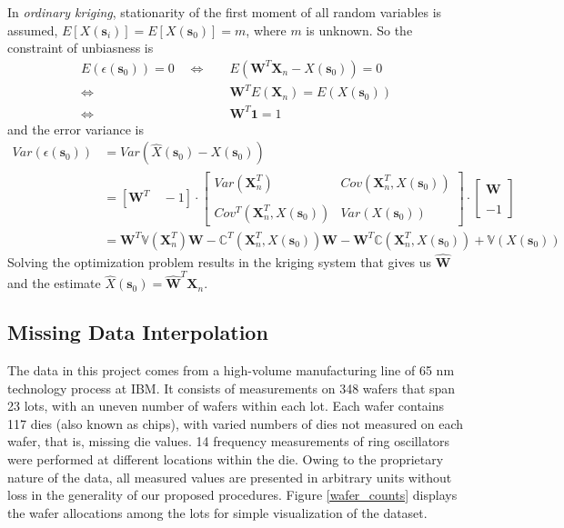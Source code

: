 \documentclass[english]{article}
\numberwithin{equation}{section}
\numberwithin{table}{section}
\numberwithin{figure}{section}
\newcommand{\bms}{\bm{s}}
\begin{document}
In \emph{ordinary kriging}, stationarity of the first moment of
all random variables is assumed, $ E[X(\bms_i)] = E[X(\bms_0)] = m$,
where $m$ is unknown. So the constraint of unbiasness is 
\begin{equation} \label{unbias}
\begin{split}
  E(\epsilon(\bms_0)) = 0 \quad 
  \Leftrightarrow \quad &E(\bm{W}^T\bm{X}_n - X(\bms_0)) = 0 \\
  \Leftrightarrow \quad &\bm{W}^TE(\bm{X}_n) = E(X(\bms_0)) \\
  \Leftrightarrow \quad &\bm{W}^T\bm{1} = 1
\end{split}
\end{equation}
and the error variance is
\begin{equation} \label{varerr}
\begin{split}
  Var(\epsilon(\bms_0)) &= Var(\hat{X}(\bms_0) - X(\bms_0)) \\
  &=[\bm{W}^T \quad -1] \cdot 
  \begin{bmatrix}
    Var(\bm{X}_n^T) &  Cov(\bm{X}_n^T,  X(\bms_0))\\
    \\
    Cov^T(\bm{X}_n^T,  X(\bms_0)) & Var(X(\bms_0))
  \end{bmatrix}
  \cdot \begin{bmatrix}
    \bm{W} \\
    \\
    -1
  \end{bmatrix} \\
 &=\bm{W}^T\mathbb{V}(\bm{X}_n^T)\bm{W} - \mathbb{C}^T(\bm{X}_n^T, X(\bms_0))\bm{W}
  - \bm{W}^T\mathbb{C}(\bm{X}_n^T, X(\bms_0)) + \mathbb{V}(X(\bms_0))
\end{split}
\end{equation}
Solving the optimization problem results in the kriging system that
gives us $\hat{\bm{W}}$ and the estimate $\hat{X}(\bms_0)=\hat{\bm{W}}^T\bm{X}_n$.


\subsection{Missing Data Interpolation} \label{nafit}

\hspace{12 pt}
The data in this project comes from a high-volume manufacturing line
of 65 nm technology process at IBM. It consists of measurements on 348
wafers that span 23 lots, with an uneven number of wafers within each
lot. Each wafer contains 117 dies (also known as chips), with varied
numbers of dies not measured on each wafer, that is, missing die
values. 14 frequency measurements of ring oscillators were performed
at different locations within the die. Owing to the proprietary nature
of the data, all measured values are presented in arbitrary units
without loss in the generality of our proposed procedures. 
Figure \ref{wafer_counts} displays the wafer allocations among the
lots for simple visualization of the dataset. 
\end{document}
